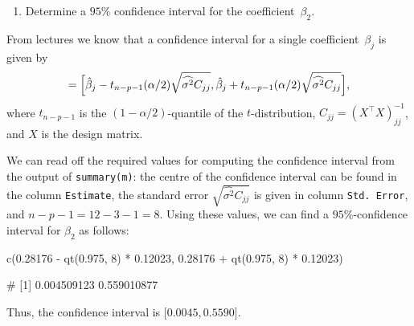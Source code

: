 \documentclass[
  a4paper,
]{article}
\newenvironment{Shaded}{\begin{snugshade}}{\end{snugshade}}
\newcommand{\DecValTok}[1]{\textcolor[rgb]{0.00,0.00,0.81}{#1}}
\newcommand{\FloatTok}[1]{\textcolor[rgb]{0.00,0.00,0.81}{#1}}
\newcommand{\FunctionTok}[1]{\textcolor[rgb]{0.00,0.00,0.00}{#1}}
\newcommand{\NormalTok}[1]{#1}
\newcommand{\SpecialCharTok}[1]{\textcolor[rgb]{0.00,0.00,0.00}{#1}}
\providecommand{\tightlist}{%
  \setlength{\itemsep}{0pt}\setlength{\parskip}{0pt}}
\theoremstyle{definition}
\theoremstyle{definition}
\theoremstyle{definition}
\theoremstyle{definition}
\theoremstyle{remark}
\begin{document}
\begin{enumerate}
\def\labelenumi{\alph{enumi}.}
\setcounter{enumi}{1}
\tightlist
\item
  Determine a \(95\%\) confidence interval for the coefficient~\(\beta_2\).
\end{enumerate}

\begin{myanswers}
From lectures we know that a confidence interval for a single
coefficient~\(\beta_j\) is given by
\begin{equation*}
  [U, V]
  = \Bigl[ \hat\beta_j - t_{n-p-1}(\alpha/2) \sqrt{\widehat{\sigma^2} C_{jj}},
       \hat\beta_j + t_{n-p-1}(\alpha/2) \sqrt{\widehat{\sigma^2} C_{jj}} \Bigr],
\end{equation*}
where \(t_{n-p-1}\) is the \((1-\alpha/2)\)-quantile of the \(t\)-distribution,
\(C_{jj} = (X^\top X)^{-1}_{jj}\), and \(X\) is the design matrix.

We can read off the required values for computing the confidence
interval from the output of \texttt{summary(m)}: the centre of the
confidence interval can be found in the column \texttt{Estimate},
the standard error \(\sqrt{\widehat{\sigma^2} C_{jj}}\) is given in
column \texttt{Std.\ Error}, and \(n-p-1 = 12 - 3 - 1 = 8\). Using
these values, we can find a \(95\%\)-confidence interval for
\(\beta_2\) as follows:

\begin{Shaded}
\begin{Highlighting}[]
  \FunctionTok{c}\NormalTok{(}\FloatTok{0.28176} \SpecialCharTok{{-}} \FunctionTok{qt}\NormalTok{(}\FloatTok{0.975}\NormalTok{, }\DecValTok{8}\NormalTok{) }\SpecialCharTok{*} \FloatTok{0.12023}\NormalTok{, }\FloatTok{0.28176} \SpecialCharTok{+} \FunctionTok{qt}\NormalTok{(}\FloatTok{0.975}\NormalTok{, }\DecValTok{8}\NormalTok{) }\SpecialCharTok{*} \FloatTok{0.12023}\NormalTok{)}
\end{Highlighting}
\end{Shaded}

\begin{Shaded}
\begin{Highlighting}[]
\NormalTok{\# [1] 0.004509123 0.559010877}
\end{Highlighting}
\end{Shaded}

Thus, the confidence interval is \(\bigl[ 0.0045, 0.5590 \bigr]\).

\end{myanswers}
\end{document}
